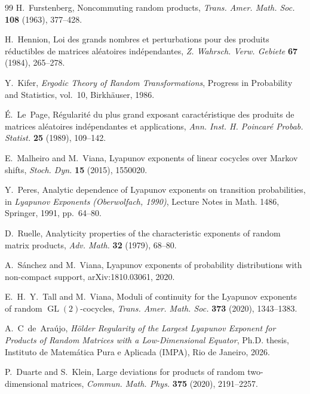 \documentclass[11pt,a4paper]{amsart}
\begin{document}
\begin{thebibliography}{99}
H.~Furstenberg,
\newblock Noncommuting random products,
\newblock \emph{Trans. Amer. Math. Soc.} \textbf{108} (1963), 377--428.

H.~Hennion,
\newblock Loi des grands nombres et perturbations pour des produits
réductibles de matrices aléatoires indépendantes,
\newblock \emph{Z. Wahrsch. Verw. Gebiete} \textbf{67} (1984), 265--278.

Y.~Kifer,
\newblock \emph{Ergodic Theory of Random Transformations},
\newblock Progress in Probability and Statistics, vol.~10,
Birkhäuser, 1986.

É.~Le~Page,
\newblock Régularité du plus grand exposant caractéristique des
produits de matrices aléatoires indépendantes et applications,
\newblock \emph{Ann. Inst. H. Poincaré Probab. Statist.}
\textbf{25} (1989), 109--142.

E.~Malheiro and M.~Viana,
\newblock Lyapunov exponents of linear cocycles over Markov shifts,
\newblock \emph{Stoch. Dyn.} \textbf{15} (2015), 1550020.

Y.~Peres,
\newblock Analytic dependence of Lyapunov exponents on transition
probabilities,
\newblock in \emph{Lyapunov Exponents (Oberwolfach, 1990)},
Lecture Notes in Math. 1486, Springer, 1991, pp.~64--80.

D.~Ruelle,
\newblock Analyticity properties of the characteristic exponents of
random matrix products,
\newblock \emph{Adv. Math.} \textbf{32} (1979), 68--80.

A.~Sánchez and M.~Viana,
\newblock Lyapunov exponents of probability distributions with
non-compact support,
\newblock arXiv:1810.03061, 2020.

E.~H.~Y.~Tall and M.~Viana,
\newblock Moduli of continuity for the Lyapunov exponents of random
$\operatorname{GL}(2)$-cocycles,
\newblock \emph{Trans. Amer. Math. Soc.} \textbf{373} (2020),
1343--1383.

A.~C~de~Araújo,
\newblock \emph{Hölder Regularity of the Largest Lyapunov Exponent for
Products of Random Matrices with a Low-Dimensional Equator},
\newblock Ph.D. thesis, Instituto de Matemática Pura e Aplicada
(IMPA), Rio de Janeiro, 2026.

P.~Duarte and S.~Klein,
\newblock Large deviations for products of random two-dimensional
matrices,
\newblock \emph{Commun. Math. Phys.} \textbf{375} (2020),
2191--2257.

\end{thebibliography}
\end{document}
